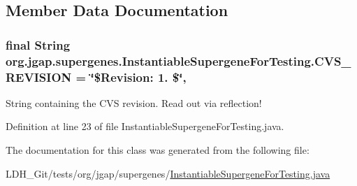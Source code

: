 \subsection{Member Data Documentation}
\hypertarget{classorg_1_1jgap_1_1supergenes_1_1_instantiable_supergene_for_testing_a8d28bf276ecc906fceb27015729f5df9}{
\subsubsection[{C\-V\-S\-\_\-\-R\-E\-V\-I\-S\-I\-O\-N}]{\setlength{\rightskip}{0pt plus 5cm}final String org.\-jgap.\-supergenes.\-Instantiable\-Supergene\-For\-Testing.\-C\-V\-S\-\_\-\-R\-E\-V\-I\-S\-I\-O\-N = \char`\"{}\$Revision\-: 1. \$\char`\"{}\hspace{0.3cm}{\ttfamily [static]}, {\ttfamily [private]}}}\label{classorg_1_1jgap_1_1supergenes_1_1_instantiable_supergene_for_testing_a8d28bf276ecc906fceb27015729f5df9}
String containing the C\-V\-S revision. Read out via reflection! 

Definition at line 23 of file Instantiable\-Supergene\-For\-Testing.\-java.



The documentation for this class was generated from the following file\-:\begin{DoxyCompactItemize}
\item 
L\-D\-H\-\_\-\-Git/tests/org/jgap/supergenes/\hyperlink{_instantiable_supergene_for_testing_8java}{Instantiable\-Supergene\-For\-Testing.\-java}\end{DoxyCompactItemize}
